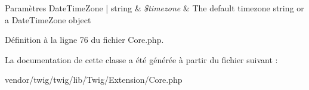\begin{DoxyParams}[1]{Paramètres}
Date\+Time\+Zone | string & {\em \$timezone} & The default timezone string or a Date\+Time\+Zone object \\
\hline
\end{DoxyParams}


Définition à la ligne 76 du fichier Core.\+php.



La documentation de cette classe a été générée à partir du fichier suivant \+:\begin{DoxyCompactItemize}
\item 
vendor/twig/twig/lib/\+Twig/\+Extension/Core.\+php\end{DoxyCompactItemize}
